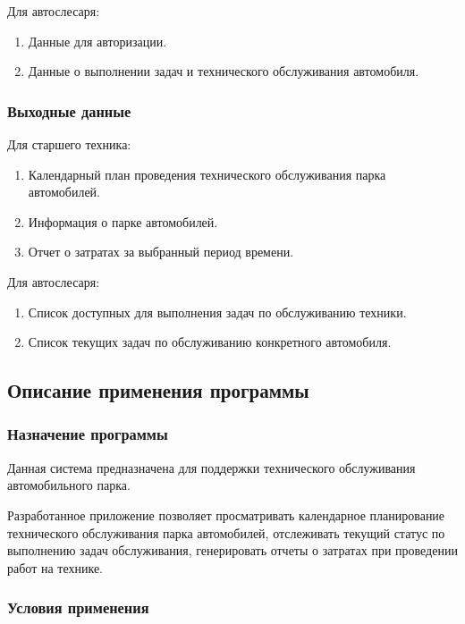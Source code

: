 \documentclass[../nirs.tex]{subfiles}
\begin{document}
    Для автослесаря:
    \begin{enumerate}
        \item Данные для авторизации.
        \item Данные о выполнении задач и технического обслуживания автомобиля.
    \end{enumerate}

    \subsubsection*{Выходные данные}
    Для старшего техника:
    \begin{enumerate}
        \item Календарный план проведения технического обслуживания парка
            автомобилей.
        \item Информация о парке автомобилей.
        \item Отчет о затратах за выбранный период времени.
    \end{enumerate}

    Для автослесаря:
    \begin{enumerate}
        \item Список доступных для выполнения задач по обслуживанию техники.
        \item Список текущих задач по обслуживанию конкретного автомобиля.
    \end{enumerate}

    \subsection{Описание применения программы}
    \subsubsection*{Назначение программы}

    Данная система предназначена для поддержки технического обслуживания
    автомобильного парка.

    Разработанное приложение позволяет просматривать календарное планирование
    технического обслуживания парка автомобилей, отслеживать текущий статус по
    выполнению задач обслуживания, генерировать отчеты о затратах при проведении
    работ на технике.

    \subsubsection*{Условия применения}
\end{document}
